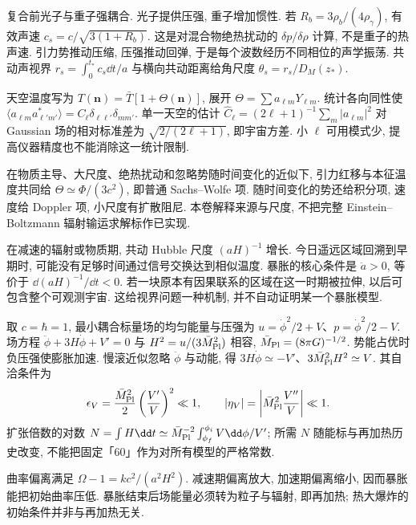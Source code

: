 \label{ch:cmb}
复合前光子与重子强耦合. 光子提供压强, 重子增加惯性. 若 $R_b=3\rho_b/(4\rho_\gamma)$, 有效声速 $c_s=c/\sqrt{3(1+R_b)}$. 这是对混合物绝热扰动的 $\delta p/\delta\rho$ 计算, 不是重子的热声速. 引力势推动压缩, 压强推动回弹, 于是每个波数经历不同相位的声学振荡. 共动声视界 $r_s=\int_0^{t_*}c_s\dd t/a$ 与横向共动距离给角尺度 $\theta_s=r_s/D_M(z_*)$.

天空温度写为 $T(\boldsymbol n)=\bar T[1+\Theta(\boldsymbol n)]$, 展开 $\Theta=\sum a_{\ell m}Y_{\ell m}$. 统计各向同性使 $\langle a_{\ell m}a^*_{\ell'm'}\rangle=C_\ell\delta_{\ell\ell'}\delta_{mm'}$. 单一天空的估计 $\widehat C_\ell=(2\ell+1)^{-1}\sum_m|a_{\ell m}|^2$ 对 Gaussian 场的相对标准差为 $\sqrt{2/(2\ell+1)}$, 即宇宙方差. 小 $\ell$ 可用模式少, 提高仪器精度也不能消除这一统计限制.

在物质主导、大尺度、绝热扰动和忽略势随时间变化的近似下, 引力红移与本征温度共同给 $\Theta\simeq\Phi/(3c^2)$, 即普通 Sachs--Wolfe 项. 随时间变化的势还给积分项, 速度给 Doppler 项, 小尺度有扩散阻尼. 本卷解释来源与尺度, 不把完整 Einstein--Boltzmann 辐射输运求解标作已实现.

在减速的辐射或物质期, 共动 Hubble 尺度 $(aH)^{-1}$ 增长. 今日遥远区域回溯到早期时, 可能没有足够时间通过信号交换达到相似温度. 暴胀的核心条件是 $\ddot a>0$, 等价于 $\dd(aH)^{-1}/\dd t<0$. 若一块原本有因果联系的区域在这一时期被拉伸, 以后可包含整个可观测宇宙. 这给视界问题一种机制, 并不自动证明某一个暴胀模型.

取 $c=\hbar=1$, 最小耦合标量场的均匀能量与压强为 $u=\dot\phi^2/2+V$、$p=\dot\phi^2/2-V$. 场方程 $\ddot\phi+3H\dot\phi+V'=0$ 与 $H^2=u/(3\bar M_{\rm Pl}^2)$ 相容, $\bar M_{\rm Pl}=(8\pi G)^{-1/2}$. 势能占优时负压强使膨胀加速. 慢滚近似忽略 $\ddot\phi$ 与动能, 得 $3H\dot\phi\simeq-V'$、$3\bar M_{\rm Pl}^2H^2\simeq V$. 其自洽条件为
\begin{equation}
\epsilon_V=\frac{\bar M_{\rm Pl}^2}2\left(\frac{V'}V\right)^2\ll1,
\qquad\left|\eta_V\right|=\left|\bar M_{\rm Pl}^2\frac{V''}V\right|\ll1.
\end{equation}
扩张倍数的对数 $N=\int H\dd t\simeq\bar M_{\rm Pl}^{-2}\int_{\phi_f}^{\phi_i}V\dd\phi/V'$; 所需 $N$ 随能标与再加热历史改变, 不能把固定「60」作为对所有模型的严格常数.

曲率偏离满足 $\Omega-1=kc^2/(a^2H^2)$. 减速期偏离放大, 加速期偏离缩小, 因而暴胀能把初始曲率压低. 暴胀结束后场能量必须转为粒子与辐射, 即再加热; 热大爆炸的初始条件并非与再加热无关.

